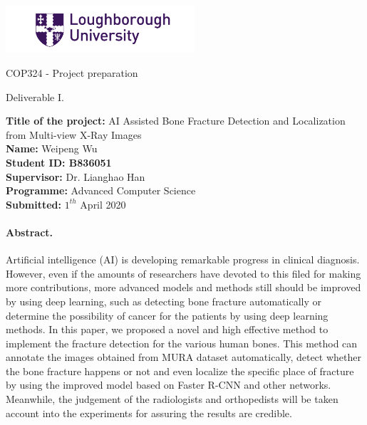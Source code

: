 \documentclass[12pt,oneside,a4paper]{article}
\newcommand*{\makeTitleParagraph}{
\begingroup
\begin{center}
\includegraphics[width = 7cm]{LoughboroughLogo.png} \par
COP324 - Project preparation\par
Deliverable I. \par
\end{center}

 
\noindent


\noindent
\textbf{Title of the project:} AI Assisted Bone Fracture Detection and Localization from Multi-view X-Ray Images\\ 
\textbf{Name:} Weipeng Wu\\
\textbf{Student ID: B836051}\\
\textbf{Supervisor:} Dr. Lianghao Han\\
\textbf{Programme:} Advanced Computer Science\\
\textbf{Submitted:} $1^{th}$ April 2020\\
\endgroup}
\begin{document}
\makeTitleParagraph %

\paragraph{Abstract.} Artificial intelligence (AI) is developing remarkable progress in clinical diagnosis. However, even if the amounts of researchers have devoted to this filed for making more contributions, more advanced models and methods still should be improved by using deep learning, such as detecting bone fracture automatically or determine the possibility of cancer for the patients by using deep learning methods. In this paper, we proposed a novel and high effective method to implement the fracture detection for the various human bones. This method can annotate the images obtained from MURA dataset automatically, detect whether the bone fracture happens or not and even localize the specific place of fracture by using the improved model based on Faster R-CNN and other networks. Meanwhile, the judgement of the radiologists and orthopedists will be taken account into the experiments for assuring the results are credible.
\end{document}
